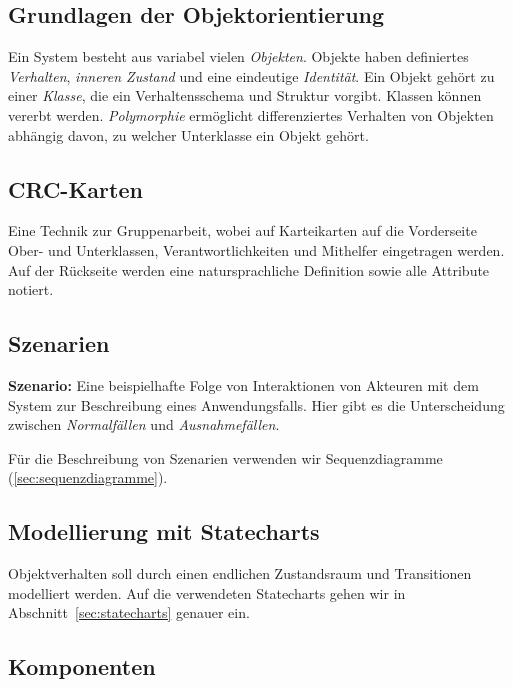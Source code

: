 \documentclass[german]{panikzettel}
\begin{document}

\subsection{Grundlagen der Objektorientierung}

Ein System besteht aus variabel vielen \emph{Objekten}.
Objekte haben definiertes \emph{Verhalten}, \emph{inneren Zustand} und eine eindeutige \emph{Identität}.
Ein Objekt gehört zu einer \emph{Klasse}, die ein Verhaltensschema und Struktur vorgibt.
Klassen können vererbt werden.
\emph{Polymorphie} ermöglicht differenziertes Verhalten von Objekten abhängig davon, zu welcher Unterklasse ein Objekt gehört.

\subsection{CRC-Karten}

Eine Technik zur Gruppenarbeit, wobei auf Karteikarten auf die Vorderseite Ober- und Unterklassen, Verantwortlichkeiten und Mithelfer eingetragen werden.
Auf der Rückseite werden eine natursprachliche Definition sowie alle Attribute notiert.

\subsection{Szenarien}

\textbf{Szenario:} Eine beispielhafte Folge von Interaktionen von Akteuren mit dem System zur Beschreibung eines Anwendungsfalls.
Hier gibt es die Unterscheidung zwischen \emph{Normalfällen} und \emph{Ausnahmefällen}.

Für die Beschreibung von Szenarien verwenden wir Sequenzdiagramme (\ref{sec:sequenzdiagramme}).

\subsection{Modellierung mit Statecharts}

Objektverhalten soll durch einen endlichen Zustandsraum und Transitionen modelliert werden.
Auf die verwendeten Statecharts gehen wir in Abschnitt~\ref{sec:statecharts} genauer ein.

\subsection{Komponenten}
\end{document}
